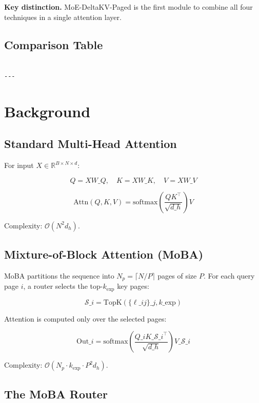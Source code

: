 \textbf{Key distinction.} MoE-DeltaKV-Paged is the first module to combine all 
four techniques in a single attention layer.



\subsection{Comparison Table}

\begin{lstlisting}

---
\end{lstlisting}

\section{Background}

\subsection{Standard Multi-Head Attention}

For input $X \in \mathbb{R}^{B \times N \times d}$:

\[
Q = X W\_Q, \quad K = X W\_K, \quad V = X W\_V
\tag{3.1}
\]

\[
\text{Attn}(Q, K, V) = \text{softmax}\!\left(\frac{Q K^\top}{\sqrt{d\_h}}\right) V
\tag{3.2}
\]

Complexity: $\mathcal{O}(N^2 d_h)$.

\subsection{Mixture-of-Block Attention (MoBA)}

MoBA partitions the sequence into $N_p = \lceil N / P \rceil$ pages of 
size $P$. For each query page $i$, a router selects the top-$k_\text{exp}$ 
key pages:

\[
\mathcal{S}\_i = \text{TopK}(\{\ell\_{ij}\}\_j, k\_\text{exp})
\tag{3.3}
\]

Attention is computed only over the selected pages:

\[
\text{Out}\_i = \text{softmax}\!\left(\frac{Q\_i K\_{\mathcal{S}\_i}^\top}{\sqrt{d\_h}}\right) V\_{\mathcal{S}\_i}
\tag{3.4}
\]

Complexity: $\mathcal{O}(N_p \cdot k_\text{exp} \cdot P^2 d_h)$.

\subsection{The MoBA Router}

